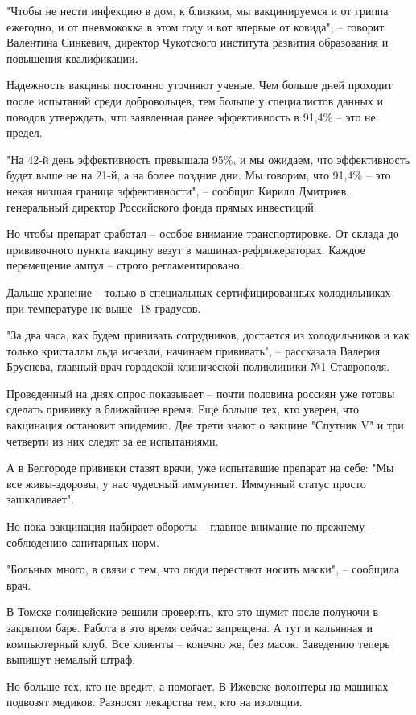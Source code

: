 "Чтобы не нести инфекцию в дом, к близким, мы вакцинируемся и от гриппа
ежегодно, и от пневмококка в этом году и вот впервые от ковида", – говорит
Валентина Синкевич, директор Чукотского института развития образования и
повышения квалификации.

Надежность вакцины постоянно уточняют ученые. Чем больше дней проходит после
испытаний среди добровольцев, тем больше у специалистов данных и поводов
утверждать, что заявленная ранее эффективность в 91,4\% – это не предел.

"На 42-й день эффективность превышала 95\%, и мы ожидаем, что эффективность
будет выше не на 21-й, а на более поздние дни. Мы говорим, что 91,4\% – это
некая низшая граница эффективности", – сообщил Кирилл Дмитриев, генеральный
директор Российского фонда прямых инвестиций.

Но чтобы препарат сработал – особое внимание транспортировке. От склада до
прививочного пункта вакцину везут в машинах-рефрижераторах. Каждое перемещение
ампул – строго регламентировано.

Дальше хранение – только в специальных сертифицированных холодильниках при
температуре не выше -18 градусов.

"За два часа, как будем прививать сотрудников, достается из холодильников и как
только кристаллы льда исчезли, начинаем прививать", – рассказала Валерия
Бруснева, главный врач городской клинической поликлиники №1 Ставрополя.

Проведенный на днях опрос показывает – почти половина россиян уже готовы
сделать прививку в ближайшее время. Еще больше тех, кто уверен, что вакцинация
остановит эпидемию. Две трети знают о вакцине "Спутник V" и три четверти из них
следят за ее испытаниями.

А в Белгороде прививки ставят врачи, уже испытавшие препарат на себе: "Мы все
живы-здоровы, у нас чудесный иммунитет. Иммунный статус просто зашкаливает".

Но пока вакцинация набирает обороты – главное внимание по-прежнему – соблюдению
санитарных норм.

"Больных много, в связи с тем, что люди перестают носить маски", – сообщила
врач.

В Томске полицейские решили проверить, кто это шумит после полуночи в закрытом
баре. Работа в это время сейчас запрещена. А тут и кальянная и компьютерный
клуб. Все клиенты – конечно же, без масок. Заведению теперь выпишут немалый
штраф.

Но больше тех, кто не вредит, а помогает. В Ижевске волонтеры на машинах
подвозят медиков. Разносят лекарства тем, кто на изоляции.

